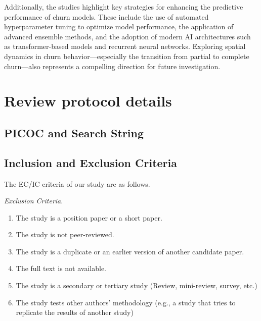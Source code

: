 \documentclass[preprint,12pt]{elsarticle}
\begin{document}
Additionally, the studies highlight key strategies for enhancing the predictive performance of churn models. These include the use of automated hyperparameter tuning to optimize model performance, the application of advanced ensemble methods, and the adoption of modern AI architectures such as transformer-based models and recurrent neural networks. Exploring spatial dynamics in churn behavior---especially the transition from partial to complete churn---also represents a compelling direction for future investigation.

%
 



\newpage
\appendix
\section{Review protocol details}
\label{Appendix}


\subsection{PICOC and Search String}
\label{subsec:Appendix-PICOC-and-Search-String}




\subsection{Inclusion and Exclusion Criteria}
\label{subsec:Appendix-IC-EC}
The EC/IC criteria of our study are as follows.

\textit{Exclusion Criteria}.
\begin{enumerate}[label=(EC\arabic*), leftmargin=19.5mm, itemsep=1pt, parsep=0pt]
    \item The study is a position paper or a short paper.
    \item The study is not peer-reviewed.
    \item The study is a duplicate or an earlier version of another candidate paper.
    \item The full text is not available.
    \item The study is a secondary or tertiary study (Review, mini-review, survey, etc.) 
    \item The study tests other authors' methodology (e.g., a study that tries to replicate the results of another study)
\end{enumerate}
\end{document}
